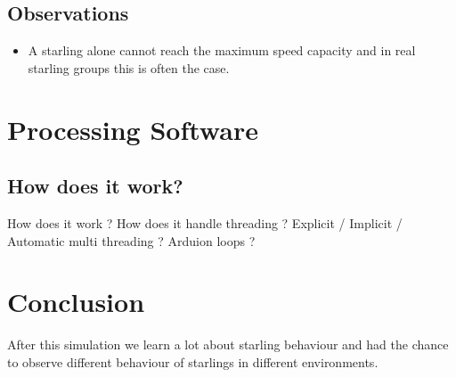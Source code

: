 \documentclass[12pt]{report}
\begin{document}
\section{Observations}

\begin{itemize}
  \item A starling alone cannot reach the maximum speed capacity and in real starling groups this is often the case.
\end{itemize}

\chapter{Processing Software}
\section{How does it work?}
How does it work ? How does it handle threading ?
Explicit / Implicit / Automatic multi threading ? Arduion loops ?

\chapter{Conclusion}
After this simulation we learn a lot about starling behaviour and had the chance to observe different behaviour of starlings in different environments.






\end{document}
